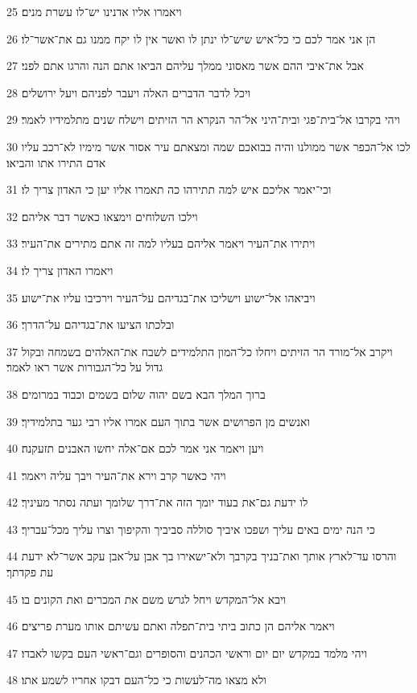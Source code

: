 \par 25 ויאמרו אליו אדנינו יש־לו עשרת מנים׃
\par 26 הן אני אמר לכם כי כל־איש שיש־לו ינתן לו ואשר אין לו יקח ממנו גם את־אשר־לו׃
\par 27 אבל את־איבי ההם אשר מאסוני ממלך עליהם הביאו אתם הנה והרגו אתם לפני׃
\par 28 ויכל לדבר הדברים האלה ויעבר לפניהם ויעל ירושלים׃
\par 29 ויהי בקרבו אל־בית־פגי ובית־היני אל־הר הנקרא הר הזיתים וישלח שנים מתלמידיו לאמר׃
\par 30 לכו אל־הכפר אשר ממולנו והיה בבואכם שמה ומצאתם עיר אסור אשר מימיו לא־רכב עליו אדם התירו אתו והביאו׃
\par 31 וכי־יאמר אליכם איש למה תתירהו כה תאמרו אליו יען כי האדון צריך לו׃
\par 32 וילכו השלוחים וימצאו כאשר דבר אליהם׃
\par 33 ויתירו את־העיר ויאמר אליהם בעליו למה זה אתם מתירים את־העיר׃
\par 34 ויאמרו האדון צריך לו׃
\par 35 ויביאהו אל־ישוע וישליכו את־בגדיהם על־העיר וירכיבו עליו את־ישוע׃
\par 36 ובלכתו הציעו את־בגדיהם על־הדרך׃
\par 37 ויקרב אל־מורד הר הזיתים ויחלו כל־המון התלמידים לשבח את־האלהים בשמחה ובקול גדול על כל־הגבורות אשר ראו לאמר׃
\par 38 ברוך המלך הבא בשם יהוה שלום בשמים וכבוד במרומים׃
\par 39 ואנשים מן הפרושים אשר בתוך העם אמרו אליו רבי גער בתלמידיך׃
\par 40 ויען ויאמר אני אמר לכם אם־אלה יחשו האבנים תזעקנה׃
\par 41 ויהי כאשר קרב וירא את־העיר ויבך עליה ויאמר׃
\par 42 לו ידעת גם־את בעוד יומך הזה את־דרך שלומך ועתה נסתר מעיניך׃
\par 43 כי הנה ימים באים עליך ושפכו איביך סוללה סביביך והקיפוך וצרו עליך מכל־עבריך׃
\par 44 והרסו עד־לארץ אותך ואת־בניך בקרבך ולא־ישאירו בך אבן על־אבן עקב אשר־לא ידעת עת פקדתך׃
\par 45 ויבא אל־המקדש ויחל לגרש משם את המכרים ואת הקונים בו׃
\par 46 ויאמר אליהם הן כתוב ביתי בית־תפלה ואתם עשיתם אותו מערת פריצים׃
\par 47 ויהי מלמד במקדש יום יום וראשי הכהנים והסופרים וגם־ראשי העם בקשו לאבדו׃
\par 48 ולא מצאו מה־לעשות כי כל־העם דבקו אחריו לשמע אתו׃

